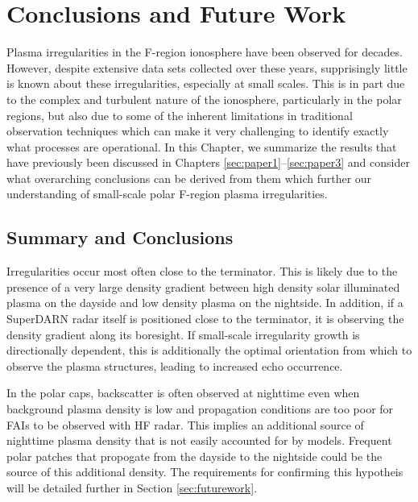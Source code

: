 
\chapter{Conclusions and Future Work}
\label{sec:conclusion}

Plasma irregularities in the F-region ionosphere have been observed for decades.  However, despite extensive data sets collected over these years, supprisingly little is known about these irregularities, especially at small scales.  This is in part due to the complex and turbulent nature of the ionosphere, particularly in the polar regions, but also due to some of the inherent limitations in traditional observation techniques which can make it very challenging to identify exactly what processes are operational.  In this Chapter, we summarize the results that have previously been discussed in Chapters \ref{sec:paper1}--\ref{sec:paper3} and consider what overarching conclusions can be derived from them which further our understanding of small-scale polar F-region plasma irregularities.

\section{Summary and Conclusions}
\label{sec:summary}

Irregularities occur most often close to the terminator.  This is likely due to the presence of a very large density gradient between high density solar illuminated plasma on the dayside and low density plasma on the nightside.  In addition, if a SuperDARN radar itself is positioned close to the terminator, it is observing the density gradient along its boresight.  If small-scale irregularity growth is directionally dependent, this is additionally the optimal orientation from which to observe the plasma structures, leading to increased echo occurrence.

In the polar caps, backscatter is often observed at nighttime even when background plasma density is low and propagation conditions are too poor for FAIs to be observed with HF radar.  This implies an additional source of nighttime plasma density that is not easily accounted for by models.  Frequent polar patches that propogate from the dayside to the nightside could be the source of this additional density.  The requirements for confirming this hypotheis will be detailed further in Section \ref{sec:futurework}.

